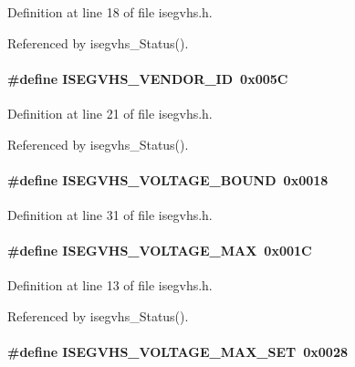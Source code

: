 Definition at line 18 of file isegvhs.h.

Referenced by isegvhs\_\-Status().
\paragraph[{ISEGVHS\_\-VENDOR\_\-ID}]{\setlength{\rightskip}{0pt plus 5cm}\#define ISEGVHS\_\-VENDOR\_\-ID~0x005C}\hfill\label{isegvhs_8h_a81878820f2c6f8f825b8be529f1aaa94}


Definition at line 21 of file isegvhs.h.

Referenced by isegvhs\_\-Status().
\paragraph[{ISEGVHS\_\-VOLTAGE\_\-BOUND}]{\setlength{\rightskip}{0pt plus 5cm}\#define ISEGVHS\_\-VOLTAGE\_\-BOUND~0x0018}\hfill\label{isegvhs_8h_a9e5a96cda28c43376c22c69406f12847}


Definition at line 31 of file isegvhs.h.
\paragraph[{ISEGVHS\_\-VOLTAGE\_\-MAX}]{\setlength{\rightskip}{0pt plus 5cm}\#define ISEGVHS\_\-VOLTAGE\_\-MAX~0x001C}\hfill\label{isegvhs_8h_a54b92f609a93116c4e63b042b2ae875b}


Definition at line 13 of file isegvhs.h.

Referenced by isegvhs\_\-Status().
\paragraph[{ISEGVHS\_\-VOLTAGE\_\-MAX\_\-SET}]{\setlength{\rightskip}{0pt plus 5cm}\#define ISEGVHS\_\-VOLTAGE\_\-MAX\_\-SET~0x0028}\hfill\label{isegvhs_8h_a44ed10339c213f2742ead45696f2b788}


